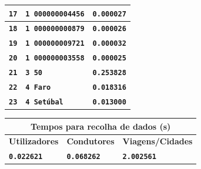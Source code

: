 \documentclass[12pt,a4paper]{report}
\begin{document}
\begin{tabularx}{\textwidth} { 
  | >{\centering\arraybackslash}X 
  | >{\centering\arraybackslash}X 
  | >{\centering\arraybackslash}X | }
 \hline
 \texttt{\textbf{17}} & \texttt{\textbf{1 000000004456}} & \texttt{\textbf{0.000027}}  \\
 \hline
 \texttt{\textbf{18}} & \texttt{\textbf{1 000000000879}} & \texttt{\textbf{0.000026}}  \\
 \hline
 \texttt{\textbf{19}} & \texttt{\textbf{1 000000009721}} & \texttt{\textbf{0.000032}}  \\
 \hline
 \texttt{\textbf{20}} & \texttt{\textbf{1 000000003558}} & \texttt{\textbf{0.000025}}  \\
 \hline
 \texttt{\textbf{21}} & \texttt{\textbf{3 50}} & \texttt{\textbf{0.253828}}  \\
 \hline
 \texttt{\textbf{22}} & \texttt{\textbf{4 Faro}} & \texttt{\textbf{0.018316}}  \\
 \hline
 \texttt{\textbf{23}} & \texttt{\textbf{4 Setúbal}} & \texttt{\textbf{0.013000}}  \\
 \hline
\end{tabularx}

\vspace{15pt}
\begin{center}
\begin{tabular}{ |p{4.73cm}|p{4.73cm}|p{4.73cm}|  }
 \hline
 \multicolumn{3}{|c|}{\textbf{Tempos para recolha de dados (s)}} \\
 \hline
 \centering\textbf{Utilizadores} & \hfil \textbf{Condutores} & \hfil \textbf{Viagens/Cidades} \\
 \hline
 \centering\textbf{\texttt{0.022621}} & \hfil \texttt{\textbf{0.068262}} & \hfil \texttt{\textbf{2.002561}}\\
 \hline
\end{tabular}
\end{center}
\end{document}
